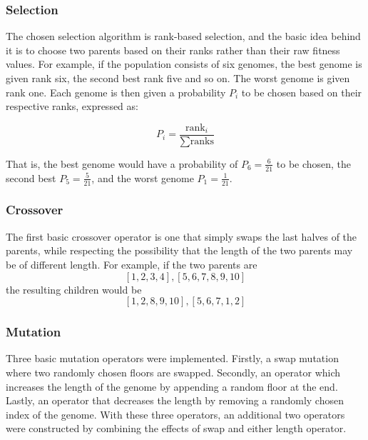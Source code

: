 \subsubsection{Selection}

    The chosen selection algorithm is rank-based selection, and the basic idea behind it is to choose two parents based on their ranks rather than their raw fitness values. For example, if the population consists of six genomes, the best genome is given rank six, the second best rank five and so on. The worst genome is given rank one. Each genome is then given a probability $ P_i $ to be chosen based on their respective ranks, expressed as:

    $$ P_i = \frac{\text{rank}_i}{\sum \text{ranks}} $$

    That is, the best genome would have a probability of $ P_6 = \frac{6}{21} $ to be chosen, the second best $ P_5 = \frac{5}{21} $, and the worst genome $ P_1 = \frac{1}{21} $.

\subsubsection{Crossover}

	The first basic crossover operator is one that simply swaps the last halves of the parents, while respecting the possibility that the length of the two parents may be of different length. For example, if the two parents are $$ [1, 2, 3, 4], [5, 6, 7, 8, 9, 10] $$ the resulting children would be $$ [1, 2, 8, 9, 10], [5, 6, 7, 1, 2] $$




\subsubsection{Mutation}

	Three basic mutation operators were implemented. Firstly, a swap mutation where two randomly chosen floors are swapped. Secondly, an operator which increases the length of the genome by appending a random floor at the end. Lastly, an operator that decreases the length by removing a randomly chosen index of the genome. With these three operators, an additional two operators were constructed by combining the effects of swap and either length operator.


